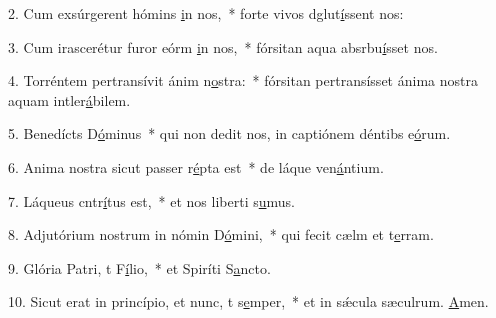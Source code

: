2. Cum exsúrgerent hómins \uline{i}n nos,~* forte vivos dglut\uline{í}ssent nos:\par 
3. Cum irascerétur furor eórm \uline{i}n nos,~* fórsitan aqua absrbu\uline{í}sset nos.\par 
4. Torréntem pertransívit ánim n\uline{o}stra:~* fórsitan pertransísset ánima nostra aquam intler\uline{á}bilem.\par 
5. Benedícts D\uline{ó}minus~* qui non dedit nos, in captiónem déntibs e\uline{ó}rum.\par 
6. Anima nostra sicut passer r\uline{é}pta est~* de láque ven\uline{á}ntium.\par 
7. Láqueus cntr\uline{í}tus est,~* et nos liberti s\uline{u}mus.\par 
8. Adjutórium nostrum in nómin D\uline{ó}mini,~* qui fecit cælm et t\uline{e}rram.\par 
9. Glória Patri, t F\uline{í}lio,~* et Spiríti S\uline{a}ncto.\par 
10. Sicut erat in princípio, et nunc, t s\uline{e}mper,~* et in sǽcula sæculrum. \uline{A}men.\par 
